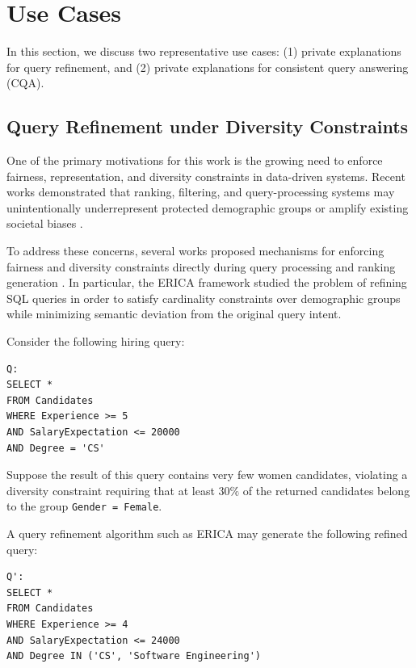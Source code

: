 
\section{Use Cases}
\label{sec:usecases}

In this section, we discuss two representative use cases:
(1) private explanations for query refinement, and
(2) private explanations for consistent query answering (CQA).

\subsection{Query Refinement under Diversity Constraints}

One of the primary motivations for this work is the growing need to enforce fairness,
representation, and diversity constraints in data-driven systems.
Recent works demonstrated that ranking, filtering, and query-processing systems
may unintentionally underrepresent protected demographic groups
or amplify existing societal biases \cite{barocas2023,friedler2016,stoyanovich2018}.

To address these concerns, several works proposed mechanisms for enforcing fairness
and diversity constraints directly during query processing and ranking generation
\cite{stoyanovich2018,erica2023}.
In particular, the \textsc{ERICA} framework \cite{erica2023}
studied the problem of refining SQL queries in order to satisfy
cardinality constraints over demographic groups while minimizing
semantic deviation from the original query intent.

Consider the following hiring query:

\begin{verbatim}
Q:
SELECT *
FROM Candidates
WHERE Experience >= 5
AND SalaryExpectation <= 20000
AND Degree = 'CS'
\end{verbatim}

Suppose the result of this query contains very few women candidates,
violating a diversity constraint requiring that at least $30\%$
of the returned candidates belong to the group
\texttt{Gender = Female}.

A query refinement algorithm such as \textsc{ERICA} may generate
the following refined query:

\begin{verbatim}
Q':
SELECT *
FROM Candidates
WHERE Experience >= 4
AND SalaryExpectation <= 24000
AND Degree IN ('CS', 'Software Engineering')
\end{verbatim}

